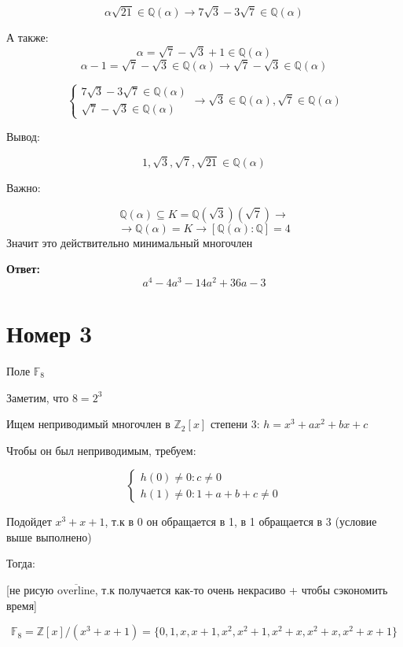 \documentclass[a4paper,12pt]{article}
\begin{document}
\[
\alpha \sqrt{21} \in \mathbb{Q}(\alpha) \rightarrow 7\sqrt{3} - 3\sqrt{7} \in \mathbb{Q}(\alpha)
\]

А также:
\[
\alpha = \sqrt{7} - \sqrt{3} + 1 \in \mathbb{Q}(\alpha) 
\]
\[
\alpha - 1 = \sqrt{7} - \sqrt{3} \in \mathbb{Q}(\alpha) \rightarrow \sqrt{7} - \sqrt{3} \in \mathbb{Q}(\alpha)
\]

\[
\begin{cases}
7\sqrt{3} - 3\sqrt{7} \in \mathbb{Q}(\alpha)\\
 \sqrt{7} - \sqrt{3} \in \mathbb{Q}(\alpha)
\end{cases} \rightarrow \sqrt{3} \in \mathbb{Q}(\alpha), \sqrt{7} \in \mathbb{Q}(\alpha)
\]

Вывод:

\[
1, \sqrt{3}, \sqrt{7}, \sqrt{21} \in \mathbb{Q}(\alpha) 
\]

Важно:

\[
\mathbb{Q}(\alpha) \subseteq K = \mathbb{Q}(\sqrt{3})(\sqrt{7}) \rightarrow 
\]
\[
\rightarrow \mathbb{Q}(\alpha) = K  \rightarrow [\mathbb{Q}(\alpha) : \mathbb{Q}] = 4
\]
Значит это действительно минимальный многочлен
\begin{center}
\textbf{Ответ: } 
\[
a^4 - 4a^3 - 14a^2 + 36a -3
\]
\end{center}

\clearpage
\section*{Номер 3}
\begin{center}
Поле $\mathbb{F}_8$
\end{center}
Заметим, что $8 = 2^3$

Ищем неприводимый многочлен в $\mathbb{Z}_2[x]$ степени 3: $h = x^3 + ax^2 + bx + c$

Чтобы он был неприводимым, требуем:

\[
\begin{cases}
h(0) \neq 0 : c \neq 0 \\
h(1) \neq 0 : 1 + a + b + c \neq 0
\end{cases}
\]

Подойдет $x^3 + x + 1$, т.к в 0 он обращается в 1, в 1 обращается в 3 (условие выше выполнено)

Тогда:

\begin{center}
[не рисую $\overline{\text{overline}}$, т.к получается как-то очень некрасиво + чтобы сэкономить время]
\end{center}
\[
\mathbb{F}_8 = \mathbb{Z}[x] / (x^3 + x + 1) = \{0, 1, x, x+1, x^2, x^2 + 1, x^2 + x, x^2 + x, x^2 + x + 1\}
\]
\end{document}
